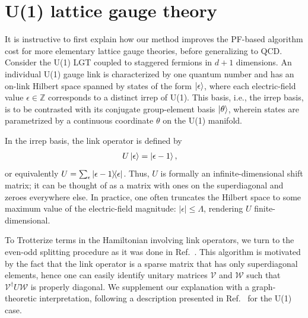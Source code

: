 \documentclass[aps,prd,twocolumn,showpacs,groupedaddress,superscriptaddress,nofootinbib,floatfix,preprintnumbers,longbibliography]{revtex4-1}
\begin{document}
\section{U(1) lattice gauge theory
\label{sec:U(1)}
}
It is instructive to first explain how our method improves the PF-based algorithm cost for more elementary lattice gauge theories, before generalizing to QCD. Consider the U(1) LGT coupled to staggered fermions in $d+1$ dimensions. An individual U(1) gauge link is characterized by one quantum number and has an on-link Hilbert space spanned by states of the form $\ket{\epsilon}$, where each electric-field value $\epsilon \in \mathbb{Z}$ corresponds to a distinct irrep of U(1). This basis, i.e., the irrep basis, is to be contrasted with its conjugate group-element basis $\ket{ \theta }$, wherein states are parametrized by a continuous coordinate $\theta$ on the U(1) manifold.

In the irrep basis, the link operator is defined by
%
\begin{align}
    U \ket{\epsilon} &= \ket{\epsilon-1},
    \label{eq:U(1)-link}
\end{align}
%
or equivalently $U  = \sum_\epsilon \ket{\epsilon - 1}\!\!\bra{\epsilon}$. Thus, $U$ is formally an infinite-dimensional shift matrix; it can be thought of as a matrix with ones on the superdiagonal and zeroes everywhere else. In practice, one often truncates the Hilbert space to some maximum value of the electric-field magnitude: $|\epsilon| \leq \Lambda$, rendering $U$ finite-dimensional.

To Trotterize terms in the Hamiltonian involving link operators, we turn to the even-odd splitting procedure as it was done in Ref.~\cite{Davoudi:2022xmb}. This algorithm is motivated by the fact that the link operator is a sparse matrix that has only superdiagonal elements, hence one can easily identify unitary matrices $\mathscr{V}$ and $\mathscr{W}$ such that $\mathscr{V}^\dagger U \mathscr{W}$ is properly diagonal. We supplement our explanation with a graph-theoretic interpretation, following a description presented in Ref.~\cite{Stryker:2021asy} for the U(1) case.

\end{document}
